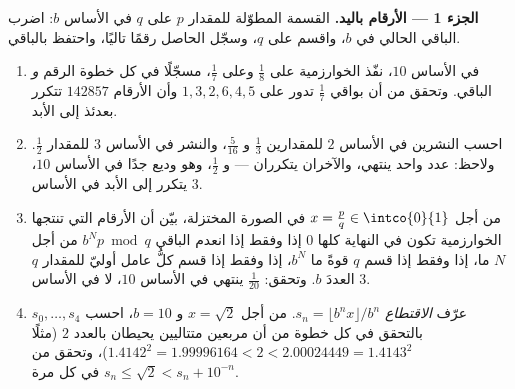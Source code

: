 \begin{problem}
\medskip
\noindent\textbf{الجزء 1 --- الأرقام باليد.} القسمة المطوّلة للمقدار $p$
على $q$ في الأساس $b$: اضرب الباقي الحالي في $b$، واقسم
على $q$، وسجّل الحاصل رقمًا تاليًا، واحتفظ بالباقي.
\begin{enumerate}
  \item في الأساس $10$، نفّذ الخوارزمية على $\frac 18$ وعلى
        $\frac 17$، مسجّلًا في كل خطوة الرقم \emph{و}
        الباقي. وتحقق من أن بواقي $\frac 17$
        تدور على $1, 3, 2, 6, 4, 5$ وأن الأرقام
        $142857$ تتكرر بعدئذ إلى الأبد.
  \item احسب النشرين في الأساس $2$ للمقدارين $\frac 13$ و
        $\frac{5}{16}$، والنشر في الأساس $3$ للمقدار $\frac 12$.
        ولاحظ: عدد واحد ينتهي، والآخران يتكرران ---
        و $\frac 12$، وهو وديع جدًا في الأساس $10$، يتكرر إلى الأبد في
        الأساس $3$.
  \item من أجل $x = \frac pq \in \intco{0}{1}$ في الصورة المختزلة، بيّن
        أن الأرقام التي تنتجها الخوارزمية تكون في النهاية
        كلها $0$ إذا وفقط إذا انعدم الباقي $b^N p \bmod q$
        من أجل $N$ ما، إذا وفقط إذا قسم $q$ قوةً ما
        $b^N$، إذا وفقط إذا قسم كلُّ عامل أوليّ للمقدار $q$
        العددَ $b$. وتحقق: $\frac{1}{20}$ ينتهي في الأساس
        $10$، لا في الأساس $3$.
  \item عرّف \emph{الاقتطاع} $s_n = \lfloor b^n x \rfloor
        / b^n$. من أجل $x = \sqrt 2$ و $b = 10$، احسب $s_0,
        \dots, s_4$ بالتحقق في كل خطوة من أن مربعين
        متتاليين يحيطان بالعدد $2$ (مثلًا $1.4142^2
        = 1.99996164 < 2 < 2.00024449 = 1.4143^2$)، وتحقق من
        $s_n \leq \sqrt 2 < s_n + 10^{-n}$ في كل مرة.
\end{enumerate}


\end{problem}
